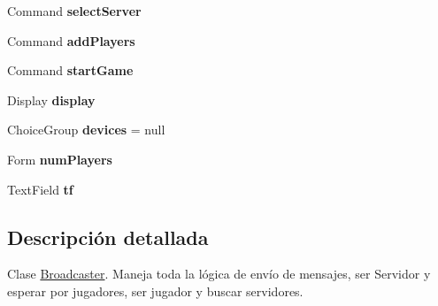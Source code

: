 \begin{DoxyCompactItemize}
\item 
\hypertarget{classBatallaEspacial_1_1Broadcaster_a24e14f55a138cc92d22b3a83ec0762a8}{
Command {\bfseries selectServer}}
\label{classBatallaEspacial_1_1Broadcaster_a24e14f55a138cc92d22b3a83ec0762a8}

\item 
\hypertarget{classBatallaEspacial_1_1Broadcaster_a1f9171f7cb03048bda0c1435de26ac12}{
Command {\bfseries addPlayers}}
\label{classBatallaEspacial_1_1Broadcaster_a1f9171f7cb03048bda0c1435de26ac12}

\item 
\hypertarget{classBatallaEspacial_1_1Broadcaster_ae007b526e1ec7cb217f766c4f8521c73}{
Command {\bfseries startGame}}
\label{classBatallaEspacial_1_1Broadcaster_ae007b526e1ec7cb217f766c4f8521c73}

\item 
\hypertarget{classBatallaEspacial_1_1Broadcaster_ae2adb35eb82cf97decf600ae0ff2569c}{
Display {\bfseries display}}
\label{classBatallaEspacial_1_1Broadcaster_ae2adb35eb82cf97decf600ae0ff2569c}

\item 
\hypertarget{classBatallaEspacial_1_1Broadcaster_a8b05c8f8ff686562dee26dc6d4c37033}{
ChoiceGroup {\bfseries devices} = null}
\label{classBatallaEspacial_1_1Broadcaster_a8b05c8f8ff686562dee26dc6d4c37033}

\item 
\hypertarget{classBatallaEspacial_1_1Broadcaster_abe842b0798e7045fe483260eea594931}{
Form {\bfseries numPlayers}}
\label{classBatallaEspacial_1_1Broadcaster_abe842b0798e7045fe483260eea594931}

\item 
\hypertarget{classBatallaEspacial_1_1Broadcaster_a9069756443074c74c46f5c2b9d27d5dc}{
TextField {\bfseries tf}}
\label{classBatallaEspacial_1_1Broadcaster_a9069756443074c74c46f5c2b9d27d5dc}

\end{DoxyCompactItemize}


\subsection{Descripción detallada}
Clase \hyperlink{classBatallaEspacial_1_1Broadcaster}{Broadcaster}. Maneja toda la lógica de envío de mensajes, ser Servidor y esperar por jugadores, ser jugador y buscar servidores. 

